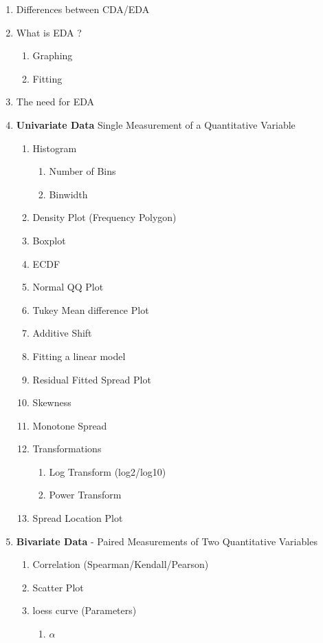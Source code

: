 \documentclass[11pt]{article}
\begin{document}
	\begin{enumerate}
		\item Differences between CDA/EDA
		\item What is EDA ?
		\begin{enumerate}
			\item Graphing
			\item Fitting
		\end{enumerate}
	    \item The need for EDA
		\item \textbf{Univariate Data} Single Measurement of a Quantitative Variable
		\begin{enumerate}
			\item Histogram
			\begin{enumerate}
				\item Number of Bins
				\item Binwidth
			\end{enumerate}
			\item Density Plot (Frequency Polygon)
			\item Boxplot
			\item ECDF
			\item Normal QQ Plot
			\item Tukey Mean difference Plot
			\item Additive Shift
			\item Fitting a linear model
			\item Residual Fitted Spread Plot
			\item Skewness
			\item Monotone Spread
			\item Transformations
			\begin{enumerate}
				\item Log Transform (log2/log10)
				\item Power Transform
			\end{enumerate}
		\item Spread Location Plot
		\end{enumerate}
	\item \textbf{Bivariate Data} - Paired Measurements of Two Quantitative Variables
	\begin{enumerate}
		\item Correlation (Spearman/Kendall/Pearson)
		\item Scatter Plot
		\item loess curve (Parameters)
		\begin{enumerate}
			\item $\alpha$

\end{enumerate}
\end{enumerate}
\end{enumerate}
\end{document}

